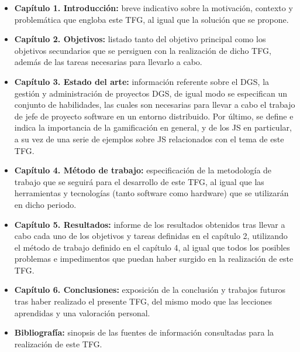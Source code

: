 \begin{itemize}
	\item \textbf{Capítulo 1. Introducción:} breve indicativo sobre la motivación, contexto y problemática que engloba este TFG, al igual que la solución que se propone.
	\item \textbf{Capítulo 2. Objetivos:} listado tanto del objetivo principal como los objetivos secundarios que se persiguen con la realización de dicho TFG, además de las tareas necesarias para llevarlo a cabo.
	\item \textbf{Capítulo 3. Estado del arte:} información referente sobre el DGS, la gestión y administración de proyectos DGS, de igual modo se especifican un conjunto de habilidades, las cuales son necesarias para llevar a cabo el trabajo de jefe de proyecto software en un entorno distribuido. Por último, se define e indica la importancia de la gamificación en general, y de los JS en particular, a su vez de una serie de ejemplos sobre JS relacionados con el tema de este TFG.
	\item \textbf{Capítulo 4. Método de trabajo:} especificación de la metodología de trabajo que se seguirá para el desarrollo de este TFG, al igual que las herramientas y tecnologías (tanto software como hardware) que se utilizarán en dicho periodo.
	\item \textbf{Capítulo 5. Resultados:} informe de los resultados obtenidos tras llevar a cabo cada uno de los objetivos y tareas definidas en el capítulo 2, utilizando el método de trabajo definido en el capítulo 4, al igual que todos los posibles problemas e impedimentos que puedan haber surgido en la realización de este TFG.
	\item \textbf{Capítulo 6. Conclusiones:} exposición de la conclusión y trabajos futuros tras haber realizado el presente TFG, del mismo modo que las lecciones aprendidas y una valoración personal.
	\item \textbf{Bibliografía:} sinopsis de las fuentes de información consultadas para la realización de este TFG.
\end{itemize}